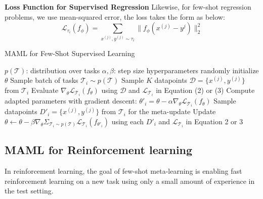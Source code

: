 \textbf{Loss Function for Supervised Regression}
Likewise, for few-shot regression problems, we use mean-squared error, the loss takes the form as below:
\begin{equation}
    \mathcal{L}_{\tau_i}(f_\phi) = \sum_{x^{(j)},y^{(j)}\sim\tau_i} \parallel f_\phi(x^{(j)} - y^{j})\parallel_2^2 
    \tag{4}
\end{equation}

\begin{algorithm}
  \caption{MAML for Few-Shot Supervised Learning}
  \label{MAML-supervised}
  \begin{algorithmic}[1]
    \REQUIRE $p(\mathcal{T})$: distribution over tasks
    \REQUIRE $\alpha, \beta$: step size hyperparameters
    \STATE randomly initialize $\theta$
    \STATE Sample batch of tasks $\mathcal{T}_i \sim p(\mathcal{T})$
    \STATE Sample $K$ datapoints $\mathcal{D}=\{x^{(j)}, y^{(j)}\}$ from $\mathcal{T}_i$
    \STATE Evaluate $\nabla_\theta \mathcal{L}_{\mathcal{T}_i} (f_\theta)$ using $\mathcal{D}$ and $\mathcal{L}_{\mathcal{T}_i}$ in Equation (2) or (3)
    \STATE Compute adapted parameters with gradient descent: $\theta'_i = \theta - \alpha\nabla_\theta \mathcal{L}_{\mathcal{T}_i} (f_\theta)$
    \STATE Sample datapoints $D'_i=\{x^{(j)}, y^{(j)}\}$ from $\mathcal{T}_i$ for the meta-update
    \ENDFOR
    \STATE Update $\theta \leftarrow \theta - \beta\nabla_\theta \Sigma_{\mathcal{T}_i \sim p(\mathcal{T})}\mathcal{L}_{\mathcal{T}_i} (f_{\theta'_i})$ using each $D'_i$ and $\mathcal{L}_{\mathcal{T}_i} $ in Equation 2 or 3
    \ENDWHILE
  \end{algorithmic}
\end{algorithm}


\subsection{MAML for Reinforcement learning}
In reinforcement learning, the goal of few-shot meta-learning is enabling fast reinforcement learning  on a new task using only a small amount of experience in the test setting.


